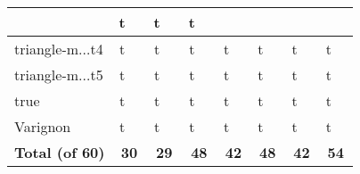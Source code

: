 {\begin{longtable}{|l|*{7}{cr|}}
& \cellcolor{green!40}t & \cellcolor{green!40}{ 70} 
& \cellcolor{green!40}t & \cellcolor{green!40}{ 72} 
& \cellcolor{green!60}t & \cellcolor{green!60}{ 7} 
\\ \hline
\cellcolor{blue!10}triangle-m$\ldots$t4 
& \cellcolor{green!60}t & \cellcolor{green!60}{\bf 6} 
& \cellcolor{green!60}t & \cellcolor{green!60}{ 15} 
& \cellcolor{green!50}t & \cellcolor{green!50}{ 22} 
& \cellcolor{green!30}t & \cellcolor{green!30}{\sl 245} 
& \cellcolor{green!40}t & \cellcolor{green!40}{ 76} 
& \cellcolor{green!40}t & \cellcolor{green!40}{ 71} 
& \cellcolor{green!60}t & \cellcolor{green!60}{ 4} 
\\ \hline
\cellcolor{blue!10}triangle-m$\ldots$t5 
& \cellcolor{green!60}t & \cellcolor{green!60}{\bf 6} 
& \cellcolor{green!60}t & \cellcolor{green!60}{ 15} 
& \cellcolor{green!50}t & \cellcolor{green!50}{ 36} 
& \cellcolor{green!30}t & \cellcolor{green!30}{\sl 235} 
& \cellcolor{green!40}t & \cellcolor{green!40}{ 76} 
& \cellcolor{green!40}t & \cellcolor{green!40}{ 79} 
& \cellcolor{green!60}t & \cellcolor{green!60}{ 5} 
\\ \hline
\cellcolor{blue!10}true 
& \cellcolor{green!60}t & \cellcolor{green!60}{\bf 1} 
& \cellcolor{green!60}t & \cellcolor{green!60}{ 1} 
& \cellcolor{green!60}t & \cellcolor{green!60}{ 1} 
& \cellcolor{green!60}t & \cellcolor{green!60}{ 1} 
& \cellcolor{green!60}t & \cellcolor{green!60}{\sl 2} 
& \cellcolor{green!60}t & \cellcolor{green!60}{ 2} 
& \cellcolor{green!60}t & \cellcolor{green!60}{ 2} 
\\ \hline
\cellcolor{blue!10}Varignon 
& \cellcolor{green!60}t & \cellcolor{green!60}{\bf 8} 
& \cellcolor{green!60}t & \cellcolor{green!60}{ 14} 
& \cellcolor{green!50}t & \cellcolor{green!50}{ 32} 
& \cellcolor{green!30}t & \cellcolor{green!30}{\sl 249} 
& \cellcolor{green!40}t & \cellcolor{green!40}{ 91} 
& \cellcolor{green!40}t & \cellcolor{green!40}{ 81} 
& \cellcolor{green!60}t & \cellcolor{green!60}{ 9} 
\\ \hline
{\bf Total (of 60)}
&\multicolumn{2}{c|}{\bf 30}
&\multicolumn{2}{c|}{\bf 29}
&\multicolumn{2}{c|}{\bf 48}
&\multicolumn{2}{c|}{\bf 42}
&\multicolumn{2}{c|}{\bf 48}
&\multicolumn{2}{c|}{\bf 42}
&\multicolumn{2}{c|}{\bf 54}
\\ \hline
\end{longtable}
}
